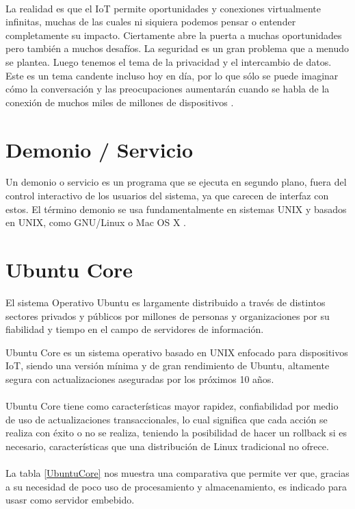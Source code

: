 \paragraph{}
La realidad es que el IoT permite oportunidades y conexiones virtualmente infinitas, muchas de las cuales ni siquiera podemos pensar o entender completamente su impacto. Ciertamente abre la puerta a muchas oportunidades pero también a muchos desafíos. La seguridad es un gran problema que a menudo se plantea. Luego tenemos el tema de la privacidad y el intercambio de datos. Este es un tema candente incluso hoy en día, por lo que sólo se puede imaginar cómo la conversación y las preocupaciones aumentarán cuando se habla de la conexión de muchos miles de millones de dispositivos \citep{MarcoTeoricoIoT2}. 



\section{Demonio / Servicio}
Un demonio o servicio es un programa que se ejecuta en segundo plano, fuera del control interactivo de los usuarios del sistema, ya que carecen de interfaz con estos. El término demonio se usa fundamentalmente en sistemas UNIX y basados en UNIX, como GNU/Linux o Mac OS X \citep{MarcoTeorico4}.


\section{Ubuntu Core}

El sistema Operativo Ubuntu es largamente distribuido a través de distintos sectores privados y públicos por millones de personas y organizaciones por su fiabilidad y tiempo en el campo de servidores de información.

Ubuntu Core es un sistema operativo basado en UNIX enfocado para dispositivos IoT, siendo una versión mínima y de gran rendimiento de Ubuntu, altamente segura con actualizaciones aseguradas por los próximos 10 años.
\paragraph{}
Ubuntu Core tiene como características mayor rapidez, confiabilidad por medio de uso de actualizaciones transaccionales, lo cual significa que cada acción se realiza con éxito o no se realiza, teniendo la posibilidad de hacer un rollback si es necesario, características que una distribución de Linux tradicional no ofrece.
\paragraph{}
La tabla \ref{UbuntuCore} nos muestra una comparativa que permite ver que, gracias a su necesidad de poco uso de procesamiento y almacenamiento, es indicado para usasr como servidor embebido.
